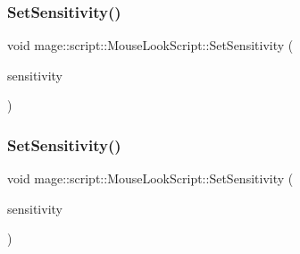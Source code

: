 \hypertarget{classmage_1_1script_1_1_mouse_look_script_ae87f7d74fa3863b5595fd4428c55caf5}{}\label{classmage_1_1script_1_1_mouse_look_script_ae87f7d74fa3863b5595fd4428c55caf5} 
\subsubsection{\texorpdfstring{Set\+Sensitivity()}{SetSensitivity()}\hspace{0.1cm}{\footnotesize\ttfamily [2/4]}}
{\footnotesize\ttfamily void mage\+::script\+::\+Mouse\+Look\+Script\+::\+Set\+Sensitivity (\begin{DoxyParamCaption}\item[{const X\+M\+F\+L\+O\+A\+T2 \&}]{sensitivity }\end{DoxyParamCaption})\hspace{0.3cm}{\ttfamily [noexcept]}}

\hypertarget{classmage_1_1script_1_1_mouse_look_script_a0a9e3cabe60928aa3fa6ca3df8473e21}{}\label{classmage_1_1script_1_1_mouse_look_script_a0a9e3cabe60928aa3fa6ca3df8473e21} 
\subsubsection{\texorpdfstring{Set\+Sensitivity()}{SetSensitivity()}\hspace{0.1cm}{\footnotesize\ttfamily [3/4]}}
{\footnotesize\ttfamily void mage\+::script\+::\+Mouse\+Look\+Script\+::\+Set\+Sensitivity (\begin{DoxyParamCaption}\item[{X\+M\+F\+L\+O\+A\+T2 \&\&}]{sensitivity }\end{DoxyParamCaption})\hspace{0.3cm}{\ttfamily [noexcept]}}

\hypertarget{classmage_1_1script_1_1_mouse_look_script_a784937d1254fe26ee28864d11956cd80}{}\label{classmage_1_1script_1_1_mouse_look_script_a784937d1254fe26ee28864d11956cd80} 
